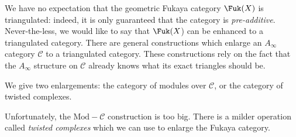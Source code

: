 

We have no expectation that the geometric Fukaya category $\Fuk(X)$ is triangulated: indeed, it is only guaranteed that the category is \emph{pre-additive}. Never-the-less, we would like to say that $\Fuk(X$) can be enhanced to a triangulated category.
There are general constructions which enlarge an $A_\infty$ category $\mathcal C$ to a triangulated category. These constructions rely on the fact that the $A_\infty$ structure on $\mathcal C$ already knows what its exact triangles should be. 

We give two enlargements: the category of modules over $\mathcal C$, or the category of twisted complexes.






Unfortunately, the $\text{Mod}-\mathcal C$ construction is too big.  There is a milder operation called \emph{twisted complexes} which we can use to enlarge the Fukaya category.
